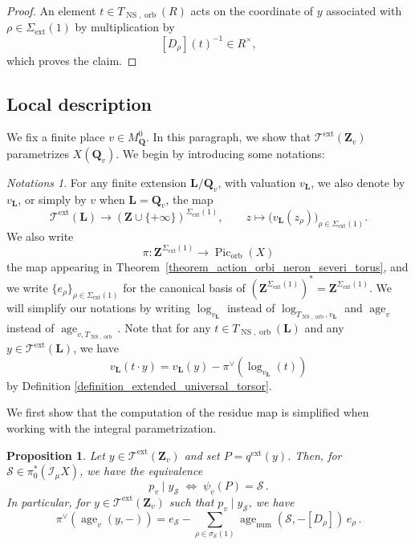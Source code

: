 \documentclass{proc-l}
\newcommand{\Z}{\mathbf{Z}}
\newcommand{\Q}{\mathbf{Q}}
\newcommand{\Le}{\mathbf{L}}
\DeclareMathOperator{\Pic}{Pic}
\DeclareMathOperator{\num}{num}
\DeclareMathOperator{\age}{age}
\DeclareMathOperator{\NS}{NS}
\DeclareMathOperator{\orb}{orb}
\DeclareMathOperator{\ext}{ext}
\newcommand{\stackS}{\mathcal{S}}
\newcommand{\stackT}{\mathcal{T}}
\newcommand{\sheafI}{\mathcal{I}}
\newcommand{\twistsector}{\pi_0^*(\sheafI_{\mu} X)}
\newtheorem{prop}[theorem]{Proposition}
\theoremstyle{definition}
\theoremstyle{remark}
\newtheorem{Notations}[theorem]{Notations}
\numberwithin{equation}{section}
\begin{document}
\begin{proof}
An element $t \in T_{\NS,\orb}(R)$ acts on the coordinate of $y$ associated with $\rho \in \Sigma_{\ext}(1)$ by multiplication by
\[
[D_{\rho}](t)^{-1} \in R^{\times},
\]
which proves the claim.
\end{proof}

\subsection{Local description}





We fix a finite place $v \in M^0_{\Q}$. In this paragraph, we show that $\stackT^{\ext}(\Z_v)$ parametrizes $X(\Q_v)$. We begin by introducing some notations:


\begin{Notations}
For any finite extension $\Le/\Q_v$, with valuation $v_{\Le}$, we also denote by
$v_{\Le}$, or simply by $v$ when $\Le=\Q_v$, the map
\[
\stackT^{\ext}(\Le) \longrightarrow \left(\Z \cup \{+\infty\}\right)^{\Sigma_{\ext}(1)},
\qquad
z \longmapsto \bigl(v_{\Le}(z_{\rho})\bigr)_{\rho \in \Sigma_{\ext}(1)} .
\]We also write
\[
\pi : \Z^{\Sigma_{\ext}(1)} \longrightarrow \Pic_{\orb}(X)
\]
the map appearing in Theorem~\ref{theorem_action_orbi_neron_severi_torus}, and we
write $\{e_{\rho}\}_{\rho \in \Sigma_{\ext}(1)}$ for the canonical basis of
$(\Z^{\Sigma_{\ext}(1)})^* = \Z^{\Sigma_{\ext}(1)}$.
We will simplify our notations by writing $\log_{v_{\Le}}$ instead of $\log_{T_{\NS,\orb},v_{\Le}}$ and $\age_v$ instead of $\age_{v,T_{\NS,\orb}}$.
Note that for any $t \in T_{\NS,\orb}(\Le)$ and any $y \in \stackT^{\ext}(\Le)$, we have
\begin{equation}\label{equation_formula_equivariance_valuation}
v_{\Le}(t \cdot y) = v_{\Le}(y) - \pi^{\vee}\left(\log_{v_{\Le}}(t)\right)    
\end{equation}by Definition \ref{definition_extended_universal_torsor}.
\end{Notations}

We first show that the computation of the residue map is simplified when working with the integral parametrization.

\begin{prop}\label{proposition_computation_residue_map_extended_parametrisation}
Let $y \in \stackT^{\ext}(\Z_v)$ and set $P = q^{\ext}(y)$. Then, for $\stackS \in \twistsector$, we have the equivalence
\[
p_v \mid y_{\stackS}
\;\Longleftrightarrow\;
\psi_v(P) = \stackS \, .
\]
In particular, for $y \in \stackT^{\ext}(\Z_v)$ such that $p_v \mid y_{\stackS}$, we have
\[
\pi^{\vee}\!\left( \age_v(y,-) \right)
= e_{\stackS}
-
\sum_{\rho \in \sigma_\stackS(1)}
\age_{\num}\!\left(\stackS,-[D_{\rho}]\right)\, e_{\rho} \, .
\]
\end{prop}
\end{document}
